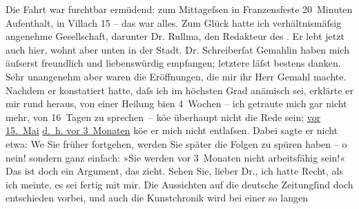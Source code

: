 {\begin{ledgroupsized}[t]{13cm}
           \pstart
           Die Fahrt war furchtbar ermüdend: zum Mittageſsen in Franzensfeste 20 Minuten Aufenthalt, in Villach 15 – das war alles. Zum Glück hatte ich
                    verhältnismäſsig angenehme Gesellschaft, darunter Dr. Rullma{\geminationn}, den Redakteur des \label{K_L00176_2v}\label{K_L00176_2h}. Er lebt
                    jetzt auch hier, wohnt aber unten in der Stadt.\pend
           \pstart
           Dr. Schreiberſa{\geminationm}t Gemahlin haben mich
                    äuſserst freundlich und liebenswürdig empfangen; letztere läſst bestens danken.
                    Sehr unangenehm aber waren die Eröffnungen, die mir ihr Herr Gemahl machte. Nachdem er konstatiert
                    hatte, daſs ich im höchsten Grad anämisch sei, erklärte er mir rund heraus, von
                    einer Heilung bi{\geminationn}en 4 Wochen – ich getraute mich
                    gar nicht mehr, von 16 Tagen zu sprechen – kö{\geminationn}e
                    überhaupt nicht die Rede sein; \uline{vor
                            15. Mai}{ }{\pb}\uline{d. h. vor 3 Monaten} kö{\geminationn}e er mich nicht entlaſsen. Dabei sagte er nicht
                    etwa: We{\geminationn} Sie früher fortgehen, werden Sie später
                    die Folgen zu spüren haben – o nein! sondern ganz einfach: »Sie werden vor
                    3 Monaten nicht arbeitsfähig sein!« Das ist doch ein Argument, das zieht.\pend
           \pstart
           Sehen Sie, lieber Dr., ich hatte Recht, als ich meinte, es sei fertig mit mir.
                    Die Aussichten auf die deutsche Zeitungſind doch entschieden vorbei, und auch die Kunstchronik wird bei einer so langen

\end{ledgroupsized}}
